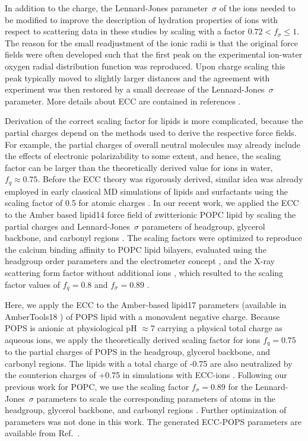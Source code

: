 \documentclass[journal=jctcce,manuscript=article]{achemso}
\begin{document}
In addition to the charge, the Lennard-Jones parameter~$\sigma$ of the ions needed to be modified 
to improve the description of hydration properties of ions with respect to scattering data in these studies 
by scaling with a factor $ 0.72 < f_\sigma \leq 1$.
The reason for the small readjustment of the ionic radii is that the original force fields were often developed such that the first peak on the experimental ion-water oxygen radial distribution function was reproduced. 
Upon charge scaling this peak typically moved to slightly larger distances and the agreement with experiment was then restored by a small decrease of the Lennard-Jones~$\sigma$ parameter.
More details about ECC are contained in references . 

Derivation of the correct scaling factor for lipids is more complicated, because
the partial charges depend on the methods used to derive the respective force fields.
For example, the partial charges of overall neutral molecules may already include the effects of electronic polarizability to some extent,
and hence, the scaling factor can be larger than the theoretically derived value for ions in water, $f_q \approx 0.75$.  
Before the ECC theory was rigorously derived, similar idea was already employed in early classical 
MD simulations of lipids and surfactants using the scaling factor of 0.5 for atomic charges  \cite{jonsson86,egberts94, berendsen1996}. 
In our recent work, we applied the ECC to the Amber based lipid14 force field of zwitterionic POPC lipid \cite{dickson14}
by scaling the partial charges and Lennard-Jones~$\sigma$ parameters of headgroup, glycerol backbone,
and carbonyl regions \cite{melcr18}. The scaling factors were optimized to reproduce 
the calcium binding affinity to POPC lipid bilayers, evaluated using the headgroup order parameters
and the electrometer concept \cite{akutsu81,altenbach84,seelig87,catte16}, and the X-ray scattering form factor
without additional ions \cite{kucerka11}, which resulted to the scaling factor values of $f_q = 0.8$ and $f_\sigma = 0.89$  \cite{melcr18}.

Here, we apply the ECC to the Amber-based lipid17 parameters \cite{lipid17-future} (available in AmberTools18 \cite{amber18})
of POPS lipid with a monovalent negative charge.
Because POPS is anionic at physiological pH $\approx 7$ carrying a physical total charge as aqueous ions, 
we apply the theoretically derived scaling factor\cite{leontyev09} for
ions $f_q = 0.75$ to the partial charges of POPS 
in the headgroup, glycerol backbone, and carbonyl regions. The lipids with a total charge of -0.75 are also neutralized
by the counterion charges of +0.75 in simulations with ECC-ions \cite{Pluharova2014, kohagen16, martinek17}.
Following our previous work for POPC, we use the scaling factor $f_\sigma = 0.89$ for the Lennard-Jones~$\sigma$ parameters 
to scale the corresponding parameters of atoms 
in the headgroup, glycerol backbone, and carbonyl regions \cite{melcr18}. 
Further optimization of parameters was not done in this work. 
The generated ECC-POPS parameters are available from Ref.~. 
\end{document}

